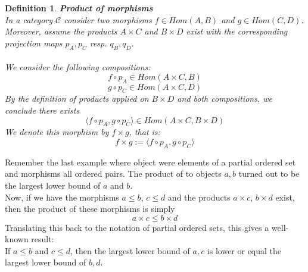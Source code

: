 \documentclass[17pt]{extarticle}
\newtheorem*{definition*}{Definition}
\begin{document}
\begin{definition*}
\textbf{Product of morphisms}\\
In a category $\mathcal{C}$ consider two morphisms $f\in Hom(A,B)$ and $g\in Hom(C,D)$. Moreover, assume the products $A\times C$ and $B\times D$ exist with the corresponding projection maps $p_A, p_C$ resp. $q_B, q_D$.\\ \\
We consider the following compositions:
$$
f\circ p_A \in Hom(A\times C, B)
$$
$$
g\circ p_C \in Hom(A\times C, D)
$$
By the definition of products applied on $B\times D$ and both compositions, we conclude there exists
$$
\langle f\circ p_A, g\circ p_C \rangle \in Hom(A\times C, B\times D)
$$
We denote this morphism by $f\times g$, that is:
$$
f\times g:=\langle f\circ p_A, g\circ p_C \rangle
$$
\end{definition*}
\leavevmode\newline
Remember the last example where object were elements of a partial ordered set and morphisms all ordered pairs. The product of to objects $a, b$ turned out to be the largest lower bound of $a$ and $b$.\\
Now, if we have the morphisms $a\leq b$, $c\leq d$ and the products $a\times c$, $b\times d$ exist, then the product of these morphisms is simply
$$a\times c\leq b\times d$$
Translating this back to the notation of partial ordered sets, this gives a well-known result:\\
If $a\leq b$ and $c\leq d$, then the largest lower bound of $a, c$ is lower or equal the largest lower bound of $b,d$.
\end{document}
